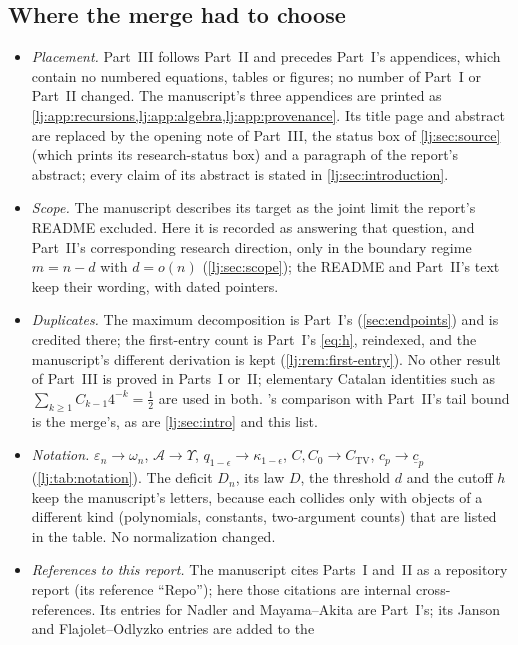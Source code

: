 \documentclass[11pt,a4paper]{article}
\theoremstyle{definition}\newaliascnt{definition}{theorem}
\theoremstyle{remark}\newaliascnt{remark}{theorem}
\newcommand{\eps}{\varepsilon}
\newcommand{\ljU}{\Upsilon}
\begin{document}
\subsection{Where the merge had to choose}
\label{lj:sec:merge}
\begin{itemize}
\item \emph{Placement.} Part~III follows Part~II and precedes Part~I's
 appendices, which contain no numbered equations, tables or figures; no
 number of Part~I or Part~II changed. The manuscript's three appendices are
 printed as \cref{lj:app:recursions,lj:app:algebra,lj:app:provenance}. Its
 title page and abstract are replaced by the opening note of Part~III, the
 status box of \cref{lj:sec:source} (which prints its research-status box)
 and a paragraph of the report's abstract; every claim of its abstract is
 stated in \cref{lj:sec:introduction}.
\item \emph{Scope.} The manuscript describes its target as the joint limit
 the report's README excluded. Here it is recorded as answering that
 question, and Part~II's corresponding research direction, only in the
 boundary regime $m=n-d$ with $d=o(n)$ (\cref{lj:sec:scope}); the README and
 Part~II's text keep their wording, with dated pointers.
\item \emph{Duplicates.} The maximum decomposition is Part~I's
 (\cref{sec:endpoints}) and is credited there; the first-entry count is
 Part~I's \eqref{eq:h}, reindexed, and the manuscript's different
 derivation is kept (\cref{lj:rem:first-entry}). No other result of
 Part~III is proved in Parts~I or~II; elementary Catalan identities such as
 $\sum_{k\ge1}C_{k-1}4^{-k}=\frac12$ are used in both. 's comparison with
 Part~II's tail bound is the merge's, as are \cref{lj:sec:intro} and this
 list.
\item \emph{Notation.} $\eps_n\to\omega_n$, $\mathcal A\to\ljU$,
 $q_{1-\epsilon}\to\kappa_{1-\epsilon}$, $C,C_0\to C_{\mathrm{TV}}$,
 $c_p\to\underline c_p$ (\cref{lj:tab:notation}). The deficit $D_n$, its
 law $D$, the threshold $d$ and the cutoff $h$ keep the manuscript's
 letters, because each collides only with objects of a different kind
 (polynomials, constants, two-argument counts) that are listed in the
 table. No normalization changed.
\item \emph{References to this report.} The manuscript cites Parts~I and~II
 as a repository report (its reference ``Repo''); here those citations are
 internal cross-references. Its entries for Nadler and Mayama--Akita are
 Part~I's; its Janson and Flajolet--Odlyzko entries are added to the

\end{itemize}
\end{document}
